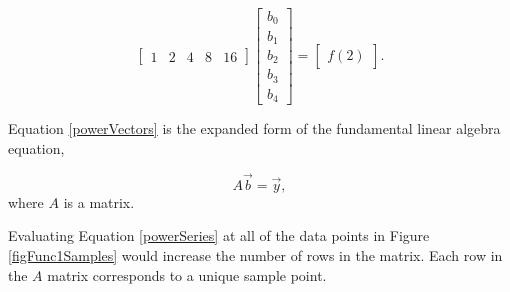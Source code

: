 \begin{equation} \label{powerVectors}
\begin{bmatrix}
1 & 2 & 4 & 8 & 16
\end{bmatrix}
\begin{bmatrix}
b_0 \\
b_1 \\
b_2 \\
b_3 \\
b_4 
\end{bmatrix}
=
\begin{bmatrix}
f(2)
\end{bmatrix} .
\end{equation}

\par Equation \ref{powerVectors} is the expanded form of the fundamental linear algebra equation, 

\begin{equation} \label{fundLinAlg}
A\vec{b} = \vec{y},
\end{equation}
where $A$ is a matrix.

\par Evaluating Equation \ref{powerSeries} at all of the data points in Figure \ref{figFunc1Samples} would increase the number of rows in the matrix. Each row in the $A$ matrix corresponds to a unique sample point.



